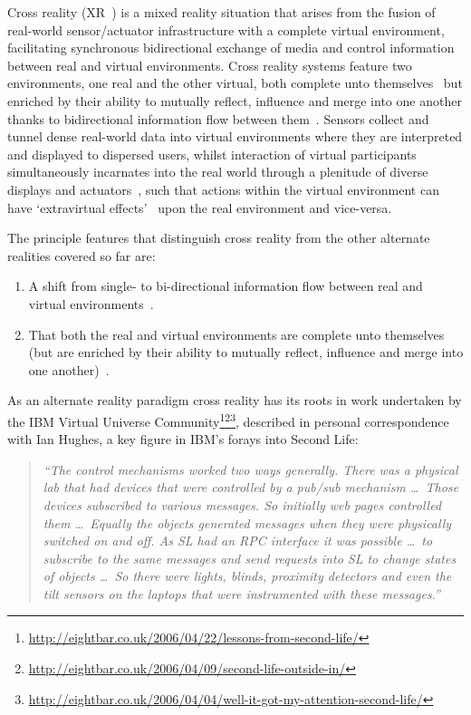 Cross reality (XR~\cite{kim:practical}) is a mixed reality situation that arises from the fusion of real-world sensor/actuator infrastructure with a complete virtual environment, facilitating synchronous bidirectional exchange of media and control information between real and virtual environments. Cross reality systems feature two environments, one real and the other virtual, both complete unto themselves~\cite{lifton:merging} but enriched by their ability to mutually reflect, influence and merge into one another thanks to bidirectional information flow between them~\cite{kim:practical}. Sensors collect and tunnel dense real-world data into virtual environments where they are interpreted and displayed to dispersed users, whilst interaction of virtual participants simultaneously incarnates into the real world through a plenitude of diverse displays and actuators~\cite{Paradiso2009}, such that actions within the virtual environment can have `extravirtual effects'~\cite{Soraker2010} upon the real environment and vice-versa.

The principle features that distinguish cross reality from the other alternate realities covered so far are:
\begin{enumerate}
	\item A shift from single- to bi-directional information flow between real and virtual environments~\cite{kim:practical}.
	\item That both the real and virtual environments are complete unto themselves (but are enriched by their ability to mutually reflect, influence and merge into one another)~\cite{lifton:merging}.
\end{enumerate}

As an alternate reality paradigm cross reality has its roots in work undertaken by the IBM Virtual Universe Community\footnote{\url{http://eightbar.co.uk/2006/04/22/lessons-from-second-life/}}\footnote{\url{http://eightbar.co.uk/2006/04/09/second-life-outside-in/}}\footnote{\url{http://eightbar.co.uk/2006/04/04/well-it-got-my-attention-second-life/}}, described in personal correspondence with Ian Hughes, a key figure in IBM's forays into Second Life:

\begin{quote}
\textit{``The control mechanisms worked two ways generally. There was a physical lab that had devices that were controlled by a pub/sub mechanism \ldots\ Those devices subscribed to various messages. So initially web pages controlled them \ldots\ Equally the objects generated messages when they were physically switched on and off. As SL\SLfootnote{} had an RPC interface it was possible \ldots\ to subscribe to the same messages and send requests into SL to change states of objects \ldots\ So there were lights, blinds, proximity detectors and even the tilt sensors on the laptops that were instrumented with these messages.''}
\end{quote}

